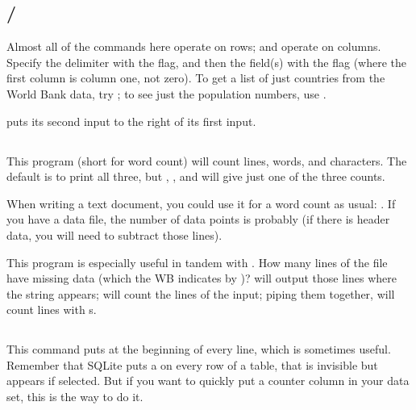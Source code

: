 \subsection{/} Almost all of the commands here
operate on rows;  and  operate on columns. Specify the
delimiter with the  flag, and then the field(s) with the 
flag (where the first column is column one, not zero). To get a list of
just countries from the World Bank data, try ; to see just the population numbers, use .

 puts its second input to the right of its first input. 


\subsection{} 
This program (short for word count) will count lines, words, and
characters. The default is to print all three, but , ,
and  will give just one of the three counts.

When writing a text document, you could use it for a word count as
usual: . If you have a data file, the number of
data points is probably  (if there is header data, you
will need to subtract those lines).

This program is especially useful in tandem with . How many lines
of the  file have missing data (which the WB indicates by
)?  will output those lines
where the string  appears;  will count the lines of the
input; piping them together,  will count lines with s.

\subsection{} This command puts  at the
beginning of every line, which is sometimes useful. Remember that SQLite
puts a  on every row of a table, that is invisible but
appears if \si{select}ed. But if you want to quickly put a counter
column in your data set, this is the way to do it.

